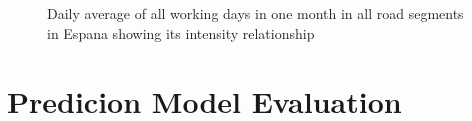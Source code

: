 \begin{figure}[h] 
\centering
    \centering
      \captionsetup{justification=centering}
    \hfill
    \caption{Daily average of all working days in one month in all road segments in Espana showing its intensity relationship}

    \label{figure_traffic_espana}
\end{figure}

































\pagebreak[4]
\section{Predicion Model Evaluation}

